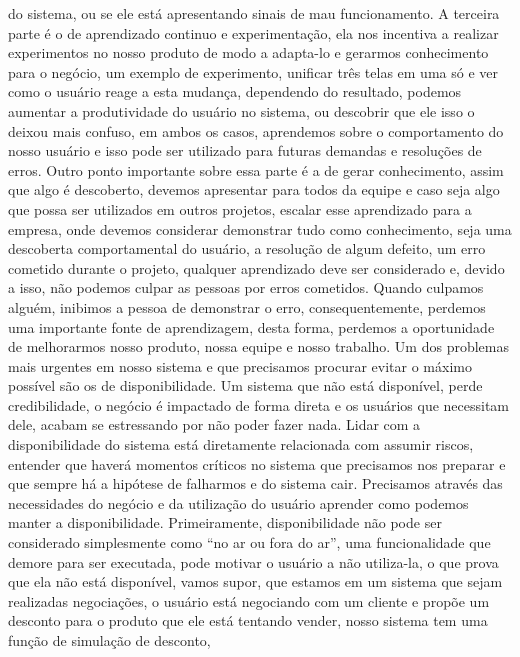     do sistema, ou se ele está apresentando sinais de mau funcionamento. A terceira
    parte é o de aprendizado continuo e experimentação, ela nos incentiva a realizar
    experimentos no nosso produto de modo a adapta-lo e gerarmos conhecimento para
    o negócio, um exemplo de experimento, unificar três telas em uma só e ver como
    o usuário reage a esta mudança, dependendo do resultado, podemos aumentar a
    produtividade do usuário no sistema, ou descobrir que ele isso o deixou mais
    confuso, em ambos os casos, aprendemos sobre o comportamento do nosso usuário
    e isso pode ser utilizado para futuras demandas e resoluções de erros. Outro
    ponto importante sobre essa parte é a de gerar conhecimento, assim que algo
    é descoberto, devemos apresentar para todos da equipe e caso seja algo que
    possa ser utilizados em outros projetos, escalar esse aprendizado para a
    empresa, onde devemos considerar demonstrar tudo como conhecimento, seja uma
    descoberta comportamental do usuário, a resolução de algum defeito, um erro
    cometido durante o projeto, qualquer aprendizado deve ser considerado e,
    devido a isso, não podemos culpar as pessoas por erros cometidos. Quando
    culpamos alguém, inibimos a pessoa de demonstrar o erro, consequentemente,
    perdemos uma importante fonte de aprendizagem, desta forma, perdemos a
    oportunidade de melhorarmos nosso produto, nossa equipe e nosso trabalho. \newline
    Um dos problemas mais urgentes em nosso sistema e que precisamos procurar evitar
    o máximo possível são os de disponibilidade. Um sistema que não está disponível,
    perde credibilidade, o negócio é impactado de forma direta e os usuários que
    necessitam dele, acabam se estressando por não poder fazer nada. Lidar com a
    disponibilidade do sistema está diretamente relacionada com assumir riscos,
    entender que haverá momentos críticos no sistema que precisamos nos preparar e
    que sempre há a hipótese de falharmos e do sistema cair. Precisamos através das
    necessidades do negócio e da utilização do usuário aprender como podemos manter
    a disponibilidade. Primeiramente, disponibilidade não pode ser considerado
    simplesmente como “no ar ou fora do ar”, uma funcionalidade que demore para ser
    executada, pode motivar o usuário a não utiliza-la, o que prova que ela não está
    disponível, vamos supor, que estamos em um sistema que sejam realizadas negociações,
    o usuário está negociando com um cliente e propõe um desconto para o produto que
    ele está tentando vender, nosso sistema tem uma função de simulação de desconto,
